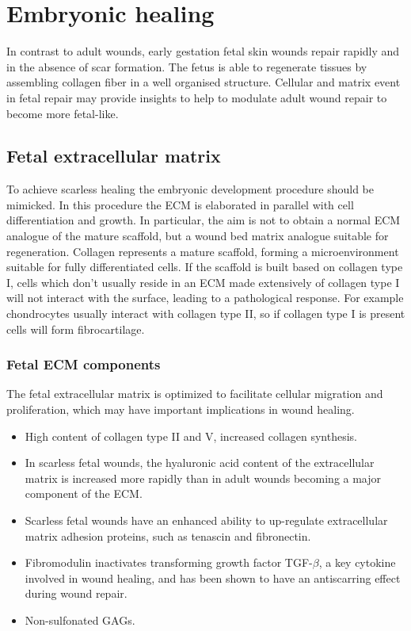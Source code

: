 \section{Embryonic healing}
In contrast to adult wounds, early gestation fetal skin wounds repair rapidly and in the absence of scar formation.
The fetus is able to regenerate tissues by assembling collagen fiber in a well organised structure.
Cellular and matrix event in fetal repair may provide insights to help to modulate adult wound repair to become more fetal-like.

	\subsection{Fetal extracellular matrix}
	To achieve scarless healing the embryonic development procedure should be mimicked.
	In this procedure the ECM is elaborated in parallel with cell differentiation and growth.
	In particular, the aim is not to obtain a normal ECM analogue of the mature scaffold, but a wound bed matrix analogue suitable for regeneration.
	Collagen represents a mature scaffold, forming a microenvironment suitable for fully differentiated cells.
	If the scaffold is built based on collagen type I, cells which don't usually reside in an ECM made extensively of collagen type I will not interact with the surface, leading to a pathological response.
	For example chondrocytes usually interact with collagen type II, so if collagen type I is present cells will form fibrocartilage.

		\subsubsection{Fetal ECM components}
		The fetal extracellular matrix is optimized to facilitate cellular migration and proliferation, which may have important implications in wound healing.

		\begin{multicols}{2}
			\begin{itemize}
				\item High content of collagen type II and V, increased collagen synthesis.
				\item In scarless fetal wounds, the hyaluronic acid content of the extracellular matrix is increased more rapidly than in adult wounds becoming a major component of the ECM.
				\item Scarless fetal wounds have an enhanced ability to up-regulate extracellular matrix adhesion proteins, such as tenascin and fibronectin.
				\item Fibromodulin inactivates transforming growth factor TGF-$\beta$, a key cytokine involved in wound healing, and has been shown to have an antiscarring effect during wound repair.
				\item Non-sulfonated GAGs.
			\end{itemize}
		\end{multicols}


